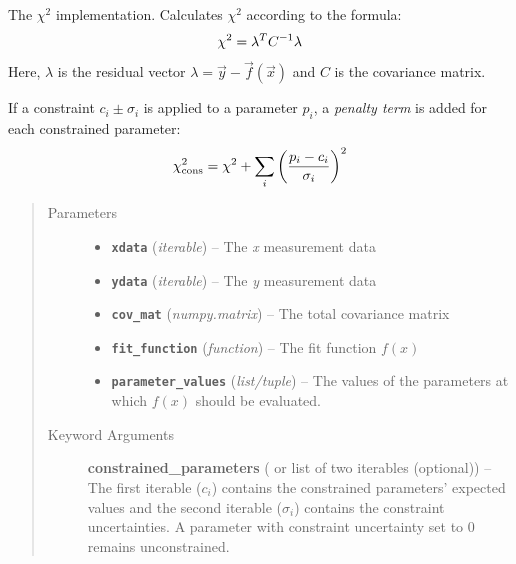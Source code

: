 \documentclass[a4paper,10pt,english]{sphinxmanual}
\begin{document}

\begin{fulllineitems}
\label{index:kafe.fit.chi2}
The \(\chi^2\) implementation. Calculates \(\chi^2\) according
to the formula:
\begin{gather}
\begin{split}\chi^2 = \lambda^T C^{-1} \lambda\end{split}\notag
\end{gather}
Here, \(\lambda\) is the residual vector \(\lambda = \vec{y} -
\vec{f}(\vec{x})\) and \(C\) is the covariance matrix.

If a constraint \(c_i\pm\sigma_i\) is applied to a parameter \(p_i\),
a \emph{penalty term} is added for each constrained parameter:
\begin{gather}
\begin{split}\chi^2_{\text{cons}} = \chi^2 + \sum_i{ \left( \frac{p_i - c_i}{\sigma_i} \right)^2 }\end{split}\notag
\end{gather}\begin{quote}\begin{description}
\item[{Parameters}] \leavevmode\begin{itemize}
\item {} 
\textbf{\texttt{xdata}} (\emph{iterable}) -- The \emph{x} measurement data

\item {} 
\textbf{\texttt{ydata}} (\emph{iterable}) -- The \emph{y} measurement data

\item {} 
\textbf{\texttt{cov\_mat}} (\emph{numpy.matrix}) -- The total covariance matrix

\item {} 
\textbf{\texttt{fit\_function}} (\emph{function}) -- The fit function \(f(x)\)

\item {} 
\textbf{\texttt{parameter\_values}} (\emph{list/tuple}) -- The values of the parameters at which \(f(x)\) should be evaluated.

\end{itemize}

\item[{Keyword Arguments}] \leavevmode
\textbf{constrained\_parameters} ( or list of two iterables (optional)) --
The first iterable (\({c_i}\)) contains the constrained parameters'
expected values and the second iterable (\({\sigma_i}\)) contains
the constraint uncertainties. A parameter with constraint uncertainty
set to 0 remains unconstrained.

\end{description}\end{quote}

\end{fulllineitems}
\end{document}
